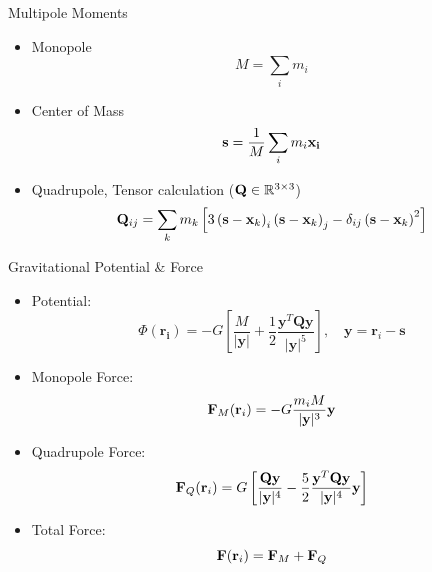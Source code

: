 \begin{frame}{Multipole Moments}
	\begin{itemize}
		\item Monopole
		      \begin{equation}
			      M = \sum_i m_i
		      \end{equation}
		\item Center of Mass
		      \begin{equation}
			      \vb{s} = \frac{1}{M}\sum_im_i\vb{x_i}
		      \end{equation}
		\item Quadrupole, Tensor calculation ($\vb{Q} \in \mathbb{R}^{3\times3}$)
		      \begin{equation}
			      \vb{Q}_{i j}=\sum_k m_k\left[3\left(\mathbf{s}-\mathbf{x}_k\right)_i\left(\mathbf{s}-\mathbf{x}_k\right)_j-\delta_{i j}\left(\mathbf{s}-\mathbf{x}_k\right)^2\right]
		      \end{equation}
	\end{itemize}
\end{frame}

\begin{frame}{Gravitational Potential \& Force}
	\begin{itemize}
		\item Potential:
		      \begin{equation}
			      \Phi(\mathbf{r_i})=-G\left[\frac{M}{|\mathbf{y}|}+\frac{1}{2} \frac{\mathbf{y}^T \mathbf{Q} \mathbf{y}}{|\mathbf{y}|^5}\right], \quad \mathbf{y}=\mathbf{r}_i-\mathbf{s}
		      \end{equation}
		\item Monopole Force:
		      \begin{equation}
			      \vb{F}_M(\vb{r}_i) = -G \frac{m_i  M}{ | \vb{y} | ^3}\vb{y}
		      \end{equation}
		\item Quadrupole Force:
		      \begin{equation}
			      \vb{F}_Q(\vb{r}_i) = G\left[\frac{\vb{Q}\vb{y}}{ | \vb{y} | ^4} - \frac{5}{2}
				      \frac{\vb{y}^T \vb{Q} \vb{y}} { | \vb{y} | ^4} \vb{y}\right]
		      \end{equation}
		\item Total Force:
		      \begin{equation}
			      \vb{F}(\vb{r}_i) = \vb{F}_M + \vb{F}_Q
		      \end{equation}
	\end{itemize}
\end{frame}

